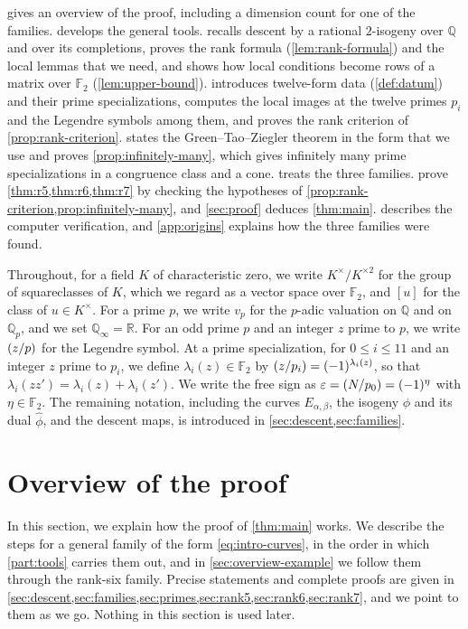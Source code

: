 \documentclass[12pt,oneside,openany]{book}
\theoremstyle{definition}
\theoremstyle{plain}
\numberwithin{equation}{chapter}
\theoremstyle{plain}
\theoremstyle{definition}
\theoremstyle{remark}
\newcommand{\Q}{\mathbb Q}
\newcommand{\F}{\mathbb F}
\newcommand{\R}{\mathbb R}
\newcommand{\leg}[2]{\mathchoice{\left(\frac{#1}{#2}\right)}{(#1/#2)}{(#1/#2)}{(#1/#2)}}
\newcommand{\sq}[1]{[#1]}
\newcommand{\sqgp}[1]{#1^{\times}/#1^{\times2}}
\newcommand{\dual}{\hat\phi}
\newcommand{\eps}{\varepsilon}
\begin{document}
 gives an overview of the proof, including a dimension count for one of the families.  develops the general tools.  recalls descent by a rational $2$-isogeny over $\Q$ and over its completions, proves the rank formula (\cref{lem:rank-formula}) and the local lemmas that we need, and shows how local conditions become rows of a matrix over $\F_2$ (\cref{lem:upper-bound}).  introduces twelve-form data (\cref{def:datum}) and their prime specializations, computes the local images at the twelve primes $p_i$ and the Legendre symbols among them, and proves the rank criterion of \cref{prop:rank-criterion}.  states the Green--Tao--Ziegler theorem in the form that we use and proves \cref{prop:infinitely-many}, which gives infinitely many prime specializations in a congruence class and a cone.  treats the three families.  prove \cref{thm:r5,thm:r6,thm:r7} by checking the hypotheses of \cref{prop:rank-criterion,prop:infinitely-many}, and \cref{sec:proof} deduces \cref{thm:main}.  describes the computer verification, and \cref{app:origins} explains how the three families were found.

Throughout, for a field $K$ of characteristic zero, we write $\sqgp{K}$ for the group of squareclasses of $K$, which we regard as a vector space over $\F_2$, and $\sq{u}$ for the class of $u\in K^\times$. For a prime $p$, we write $v_p$ for the $p$-adic valuation on $\Q$ and on $\Q_p$, and we set $\Q_\infty=\R$. For an odd prime $p$ and an integer $z$ prime to $p$, we write $\leg zp$ for the Legendre symbol. At a prime specialization, for $0\le i\le 11$ and an integer $z$ prime to $p_i$, we define $\lambda_i(z)\in\F_2$ by $\leg{z}{p_i}=(-1)^{\lambda_i(z)}$, so that $\lambda_i(zz')=\lambda_i(z)+\lambda_i(z')$. We write the free sign as $\eps=\leg{N}{p_0}=(-1)^\eta$ with $\eta\in\F_2$. The remaining notation, including the curves $E_{\alpha,\beta}$, the isogeny $\phi$ and its dual $\dual$, and the descent maps, is introduced in \cref{sec:descent,sec:families}.
\chapter{Overview of the proof}\label{sec:overview}

In this section, we explain how the proof of \cref{thm:main} works. We describe the steps for a general family of the form \eqref{eq:intro-curves}, in the order in which \cref{part:tools} carries them out, and in \cref{sec:overview-example} we follow them through the rank-six family. Precise statements and complete proofs are given in \cref{sec:descent,sec:families,sec:primes,sec:rank5,sec:rank6,sec:rank7}, and we point to them as we go. Nothing in this section is used later.
\end{document}
